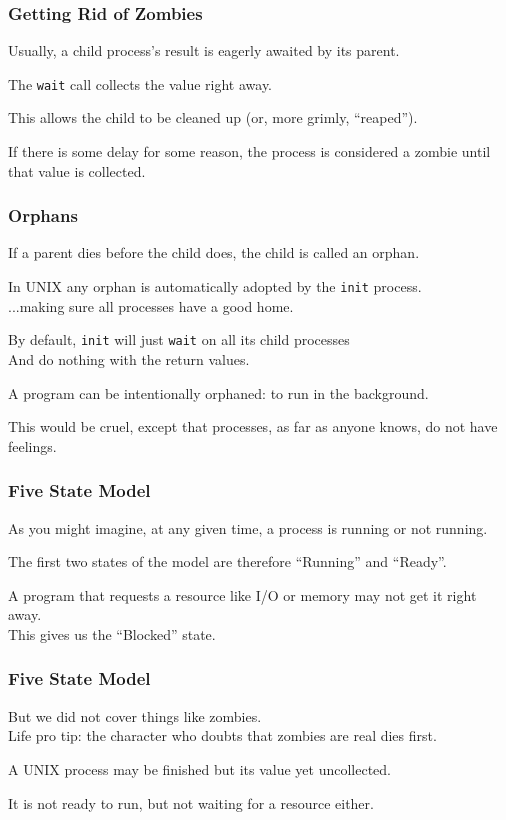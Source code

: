 \begin{frame}
\frametitle{Getting Rid of Zombies}

Usually, a child process's result is eagerly awaited by its parent. 

The \texttt{wait} call collects the value right away.

This allows the child to be cleaned up (or, more grimly, ``reaped''). 

If there is some delay for some reason, the process is considered a zombie until that value is collected.

\end{frame}


\begin{frame}
\frametitle{Orphans}

If a parent dies before the child does, the child is called an \alert{orphan}. 

In UNIX any orphan is automatically adopted by the \texttt{init} process.\\
\quad ...making sure all processes have a good home. 

By default, \texttt{init} will just \texttt{wait} on all its child processes\\
\quad And do nothing with the return values.

A program can be intentionally orphaned: to run in the background.


This would be cruel, except that processes, as far as anyone knows, do not have feelings.


\end{frame}


\begin{frame}
\frametitle{Five State Model}

As you might imagine, at any given time, a process is running or not running. 

The first two states of the model are therefore ``Running'' and ``Ready''.

A program that requests a resource like I/O or memory may not get it right away.\\
\quad This gives us the ``Blocked'' state.

\end{frame}


\begin{frame}
\frametitle{Five State Model}

But we did not cover things like zombies.\\
\quad Life pro tip: the character who doubts that zombies are real dies first.

A UNIX process may be finished but its value yet uncollected.

It is not ready to run, but not waiting for a resource either.

\end{frame}


